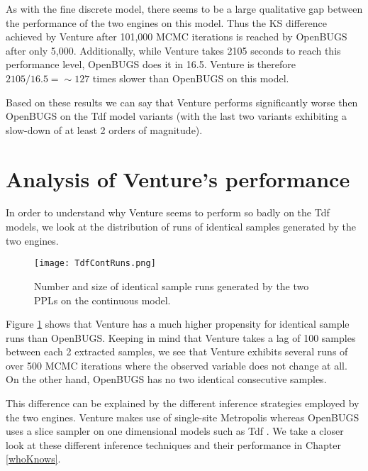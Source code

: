 As with the fine discrete model, there seems to be a large qualitative gap between the performance of the two engines on this model. Thus the KS difference achieved by Venture after 101,000 MCMC iterations is reached by OpenBUGS after only 5,000. Additionally, while Venture takes 2105 seconds to reach this performance level, OpenBUGS does it in 16.5. Venture is therefore $2105/16.5 = \sim 127$ times slower than OpenBUGS on this model.

Based on these results we can say that Venture performs significantly worse then OpenBUGS on the Tdf model variants (with the last two variants exhibiting a slow-down of at least 2 orders of magnitude).

\section{Analysis of Venture's performance}

In order to understand why Venture seems to perform so badly on the Tdf models, we look at the distribution of runs of identical samples generated by the two engines.

\begin{figure}[H]
    \centering
    \texttt{[image: TdfContRuns.png]}
    \caption{Number and size of identical sample runs generated by the two PPLs on the continuous model.}
    \label{fig:tdfContRun}
\end{figure}

Figure \ref{fig:tdfContRun} shows that Venture has a much higher propensity for identical sample runs than OpenBUGS. Keeping in mind that Venture takes a lag of 100 samples between each 2 extracted samples, we see that Venture exhibits several runs of over 500 MCMC iterations where the observed variable does not change at all. On the other hand, OpenBUGS has no two identical consecutive samples.

This difference can be explained by the different inference strategies employed by the two engines. Venture makes use of single-site Metropolis whereas OpenBUGS uses a slice sampler on one dimensional models such as Tdf . We take a closer look at these different inference techniques and their performance in Chapter \ref{whoKnows}.


